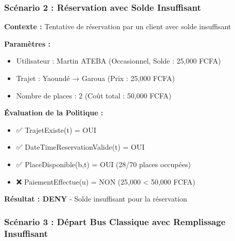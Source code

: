 \documentclass[12pt,a4paper]{article}
\begin{document}
    \subsubsection{Scénario 2 : Réservation avec Solde Insuffisant}

    \begin{resultbox}
        \textbf{Contexte :} Tentative de réservation par un client avec solde insuffisant

        \textbf{Paramètres :}
        \begin{itemize}
            \item Utilisateur : Martin ATEBA (Occasionnel, Solde : 25,000 FCFA)
            \item Trajet : Yaoundé → Garoua (Prix : 25,000 FCFA)
            \item Nombre de places : 2 (Coût total : 50,000 FCFA)
        \end{itemize}

        \textbf{Évaluation de la Politique :}
        \begin{itemize}
            \item ✅ TrajetExiste(t) = OUI
            \item ✅ DateTimeReservationValide(t) = OUI
            \item ✅ PlaceDisponible(b,t) = OUI (28/70 places occupées)
            \item ❌ PaiementEffectue(u) = NON (25,000 < 50,000 FCFA)
        \end{itemize}

        \textbf{Résultat : DENY} - Solde insuffisant pour la réservation
    \end{resultbox}

    \subsubsection{Scénario 3 : Départ Bus Classique avec Remplissage Insuffisant}
\end{document}

